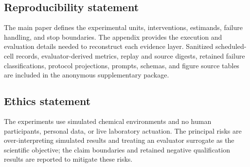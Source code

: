 \documentclass{article}
\begin{document}
\subsection*{Reproducibility statement}
The main paper defines the experimental units, interventions, estimands, failure handling, and stop
boundaries. The appendix provides the execution and evaluation details needed to reconstruct each
evidence layer. Sanitized scheduled-cell records, evaluator-derived metrics, replay and source
digests, retained failure classifications, protocol projections, prompts, schemas, and figure source
tables are included in the anonymous supplementary package.

\subsection*{Ethics statement}
The experiments use simulated chemical environments and no human participants, personal data, or
live laboratory actuation. The principal risks are over-interpreting simulated results and treating
an evaluator surrogate as the scientific objective; the claim boundaries and retained negative
qualification results are reported to mitigate these risks.




\clearpage
\appendix

\end{document}
